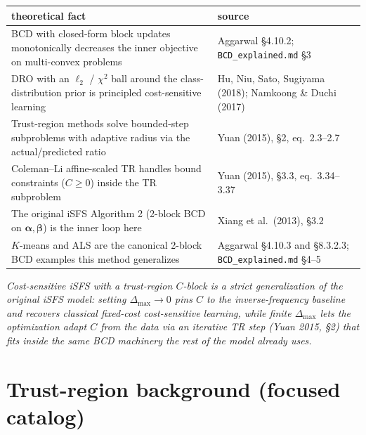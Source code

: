 \documentclass[11pt,a4paper]{article}
\begin{document}
\bigskip

\begin{center}
\small
\begin{tabular}{ll}
\toprule
\textbf{theoretical fact} & \textbf{source} \\
\midrule
BCD with closed-form block updates monotonically decreases the inner objective on multi-convex problems & Aggarwal \S 4.10.2; \texttt{BCD\_explained.md} \S 3 \\
DRO with an $\ell_2$ / $\chi^2$ ball around the class-distribution prior is principled cost-sensitive learning & Hu, Niu, Sato, Sugiyama (2018); Namkoong \& Duchi (2017) \\
Trust-region methods solve bounded-step subproblems with adaptive radius via the actual/predicted ratio & Yuan (2015), \S 2, eq.\ 2.3--2.7 \\
Coleman--Li affine-scaled TR handles bound constraints ($C \ge 0$) inside the TR subproblem & Yuan (2015), \S 3.3, eq.\ 3.34--3.37 \\
The original iSFS Algorithm 2 (2-block BCD on $\boldsymbol{\alpha}, \boldsymbol{\beta}$) is the inner loop here & Xiang et al.\ (2013), \S 3.2 \\
$K$-means and ALS are the canonical 2-block BCD examples this method generalizes & Aggarwal \S 4.10.3 and \S 8.3.2.3; \texttt{BCD\_explained.md} \S 4--5 \\
\bottomrule
\end{tabular}
\end{center}

\bigskip

\begin{center}
\emph{Cost-sensitive iSFS with a trust-region $C$-block is a strict generalization of the original iSFS model: setting $\Delta_{\max} \to 0$ pins $C$ to the inverse-frequency baseline and recovers classical fixed-cost cost-sensitive learning, while finite $\Delta_{\max}$ lets the optimization adapt $C$ from the data via an iterative TR step (Yuan 2015, \S 2) that fits inside the same BCD machinery the rest of the model already uses.}
\end{center}

\appendix
\section{Trust-region background (focused catalog)}
\end{document}
